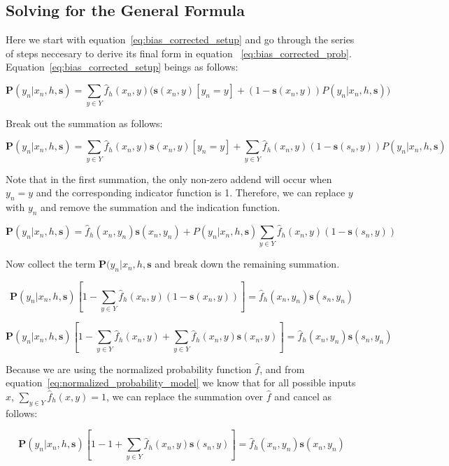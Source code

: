 \documentclass[twoside]{article}
\begin{document}
\begin{appendices}

\section{Solving for the General Formula}
\label{appendix:solving}

Here we start with equation~\eqref{eq:bias_corrected_setup} and go through the series of steps neccesary to derive its final form in equation ~\eqref{eq:bias_corrected_prob}. Equation~\eqref{eq:bias_corrected_setup} beings as follows:

\[\mathbf{P}(y_n|x_n,h,\mathbf{s})=\sum_{y \in Y}\hat{f}_h(x_n,y)\big(\mathbf{s}(x_n,y)\left [y_n = y\right ] + (1-\mathbf{s}(x_n,y))P(y_n|x_n,h,\mathbf{s})\big)\]

Break out the summation as follows:

\[\mathbf{P}(y_n|x_n,h,\mathbf{s})=\sum_{y \in Y}\hat{f}_h(x_n,y)\mathbf{s}(x_n,y)\left [y_n = y\right ] +\sum_{y \in Y}\hat{f}_h(x_n,y)(1-\mathbf{s}(s_n,y))P(y_n|x_n,h,\mathbf{s})\]

Note that in the first summation, the only non-zero addend will occur when \(y_n = y\) and the corresponding indicator function is 1. Therefore, we can replace \(y\) with \(y_n\) and remove the summation and the indication function.

\[\mathbf{P}(y_n|x_n,h,\mathbf{s})=\hat{f}_h(x_n,y_n)\mathbf{s}(x_n,y_n) +P(y_n|x_n,h,\mathbf{s})\sum_{y \in Y}\hat{f}_h(x_n,y)(1-\mathbf{s}(s_n,y))\]

Now collect the term \(\mathbf{P}(y_n|x_n,h,\mathbf{s}\) and break down the remaining summation.

\[\mathbf{P}(y_n|x_n,h,\mathbf{s})\left [ 1 - \sum_{y \in Y}\hat{f}_h(x_n,y)(1-\mathbf{s}(x_n,y)) \right ]=\hat{f}_h(x_n,y_n)\mathbf{s}(s_n,y_n) \]

\[\mathbf{P}(y_n|x_n,h,\mathbf{s})\left [ 1 - \sum_{y \in Y}\hat{f}_h(x_n,y)+\sum_{y \in Y}\hat{f}_h(x_n,y)\mathbf{s}(x_n,y) \right ]=\hat{f}_h(x_n,y_n)\mathbf{s}(s_n,y_n) \]

Because we are using the normalized probability function \(\hat{f}\), and from equation~\eqref{eq:normalized_probability_model} we know that for all possible inputs \(x\), \(\sum_{y \in Y} \hat{f}_h(x, y) = 1\), we can replace the summation over \(\hat{f}\) and cancel as follows:

\[\mathbf{P}(y_n|x_n,h,\mathbf{s})\left [ 1 - 1+\sum_{y \in Y}\hat{f}_h(x_n,y)\mathbf{s}(s_n,y) \right ]=\hat{f}_h(x_n,y_n)\mathbf{s}(x_n,y_n) \]


\end{appendices}
\end{document}
